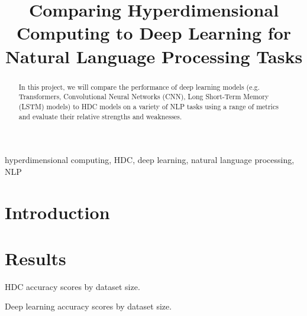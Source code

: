 \documentclass[conference]{IEEEtran}
\begin{document}
\title{Comparing Hyperdimensional Computing to Deep Learning for Natural Language Processing Tasks}

\author{
\and
{}
}

\maketitle

\begin{abstract}
    In this project, we will compare the performance of deep learning models (e.g. Transformers, Convolutional Neural Networks (CNN), Long Short-Term Memory (LSTM) models) to HDC models on a variety of NLP tasks using a range of metrics and evaluate their relative strengths and weaknesses.
\end{abstract}

\begin{IEEEkeywords}
hyperdimensional computing, HDC, deep learning, natural language processing, NLP
\end{IEEEkeywords}

\section{Introduction}
\cite{BEIR}

\section{Results}

\begin{table}[htbp]
\caption{HDC accuracy scores by dataset size.}
\begin{center}
    
\end{center}
\label{tab:hdc_acc}
\end{table}

\begin{table}[htbp]
    \caption{Deep learning accuracy scores by dataset size.}
    \begin{center}
        
    \end{center}
    \label{tab:dl_acc}
\end{table}
\end{document}
